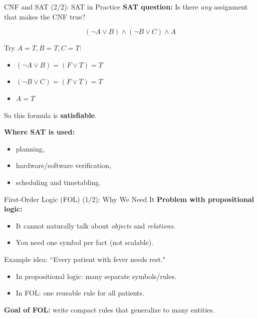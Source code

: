 \documentclass[10pt]{beamer}
\begin{document}
\begin{frame}{CNF and SAT (2/2): SAT in Practice}
        \textbf{SAT question:} Is there \emph{any} assignment that makes the CNF true?

        \vspace{0.12cm}
        \[
            (\neg A \lor B) \land (\neg B \lor C) \land A
        \]

        \vspace{0.08cm}
        Try $A{=}T, B{=}T, C{=}T$:
        \begin{itemize}
                \item $(\neg A \lor B) = (F \lor T) = T$
                \item $(\neg B \lor C) = (F \lor T) = T$
                \item $A = T$
        \end{itemize}
        So this formula is \textbf{satisfiable}.

        \vspace{0.1cm}
        \textbf{Where SAT is used:}
        \begin{itemize}
                \item planning,
                \item hardware/software verification,
                \item scheduling and timetabling.
        \end{itemize}
\end{frame}

\begin{frame}{First-Order Logic (FOL) (1/2): Why We Need It}
        \textbf{Problem with propositional logic:}
        \begin{itemize}
                \item It cannot naturally talk about \emph{objects} and \emph{relations}.
                \item You need one symbol per fact (not scalable).
        \end{itemize}

        \vspace{0.12cm}
        Example idea: ``Every patient with fever needs rest."
        \begin{itemize}
                \item In propositional logic: many separate symbols/rules.
                \item In FOL: one reusable rule for all patients.
        \end{itemize}

        \vspace{0.12cm}
        \textbf{Goal of FOL:} write compact rules that generalize to many entities.
\end{frame}
\end{document}
